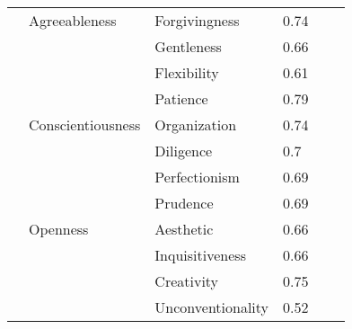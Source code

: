 \documentclass[man]{apa6}
\theoremstyle{definition}
\theoremstyle{definition}
\theoremstyle{definition}
\theoremstyle{remark}
\begin{document}
\begin{table}[1]
\begin{tabular}{llllll}
             & Agreeableness          & Forgivingness          & 0.74        &          &              \\
             &                        & Gentleness             & 0.66        &          &              \\
             &                        & Flexibility            & 0.61        &          &              \\
             &                        & Patience               & 0.79        &          &              \\
             & Conscientiousness      & Organization           & 0.74        &          &              \\
             &                        & Diligence              & 0.7         &          &              \\
             &                        & Perfectionism          & 0.69        &          &              \\
             &                        & Prudence               & 0.69        &          &              \\
             & Openness               & Aesthetic              & 0.66        &          &              \\
             &                        & Inquisitiveness        & 0.66        &          &              \\
             &                        & Creativity             & 0.75        &          &              \\
             &                        & Unconventionality      & 0.52        &          &              \\
\end{tabular}
\end{table}
\end{document}
